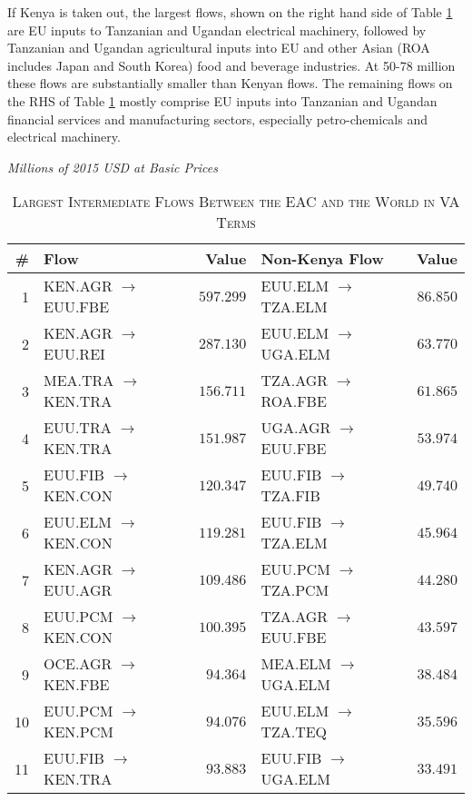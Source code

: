 \documentclass[a4paper]{article}
\begin{document}
If Kenya is taken out, the largest flows, shown on the right hand side of Table \ref{tab:VAweaclfl} are EU inputs to Tanzanian and Ugandan electrical machinery, followed by Tanzanian and Ugandan agricultural inputs into EU and other Asian (ROA includes Japan and South Korea) food and beverage industries. At 50-78 million these flows are substantially smaller than Kenyan flows. The remaining flows on the RHS of Table \ref{tab:VAweaclfl} mostly comprise EU inputs into Tanzanian and Ugandan financial services and manufacturing sectors, especially petro-chemicals and electrical machinery. %

\begin{table}[!htbp] \centering 
  \caption{\textsc{Largest Intermediate Flows Between the EAC and the World in VA Terms}} 
  \small{\textit{Millions of 2015 USD at Basic Prices}}
  \label{tab:VAweaclfl} 
  \vspace{2mm}
\begin{tabular}{rlrlr} \toprule
\textbf{\#} & \textbf{Flow} & \textbf{Value} & \textbf{Non-Kenya Flow} & \textbf{Value} \\ 
\midrule
1 & KEN.AGR $\to$  EUU.FBE & $597.299$ & EUU.ELM $\to$  TZA.ELM & $86.850$ \\ 
2 & KEN.AGR $\to$  EUU.REI & $287.130$ & EUU.ELM $\to$  UGA.ELM & $63.770$ \\ 
3 & MEA.TRA $\to$  KEN.TRA & $156.711$ & TZA.AGR $\to$  ROA.FBE & $61.865$ \\ 
4 & EUU.TRA $\to$  KEN.TRA & $151.987$ & UGA.AGR $\to$  EUU.FBE & $53.974$ \\ 
5 & EUU.FIB $\to$  KEN.CON & $120.347$ & EUU.FIB $\to$  TZA.FIB & $49.740$ \\ 
6 & EUU.ELM $\to$  KEN.CON & $119.281$ & EUU.FIB $\to$  TZA.ELM & $45.964$ \\ 
7 & KEN.AGR $\to$  EUU.AGR & $109.486$ & EUU.PCM $\to$  TZA.PCM & $44.280$ \\ 
8 & EUU.PCM $\to$  KEN.CON & $100.395$ & TZA.AGR $\to$  EUU.FBE & $43.597$ \\ 
9 & OCE.AGR $\to$  KEN.FBE & $94.364$ & MEA.ELM $\to$  UGA.ELM & $38.484$ \\ 
10 & EUU.PCM $\to$  KEN.PCM & $94.076$ & EUU.ELM $\to$  TZA.TEQ & $35.596$ \\ 
11 & EUU.FIB $\to$  KEN.TRA & $93.883$ & EUU.FIB $\to$  UGA.ELM & $33.491$ \\ 

\end{tabular}
\end{table}
\end{document}
